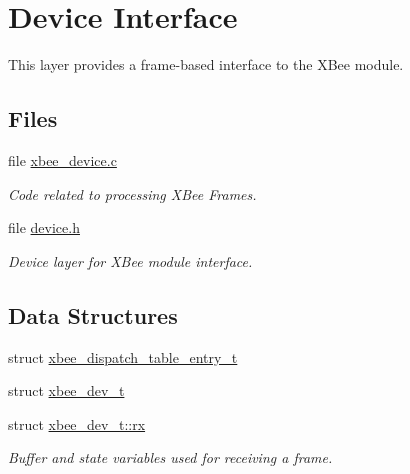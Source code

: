 \hypertarget{group__xbee__device}{\section{Device Interface}
\label{group__xbee__device}
}


This layer provides a frame-\/based interface to the X\-Bee module.  


\subsection*{Files}
\begin{DoxyCompactItemize}
\item 
file \hyperlink{xbee__device_8c}{xbee\-\_\-device.\-c}
\begin{DoxyCompactList}\small\item\em Code related to processing X\-Bee Frames. \end{DoxyCompactList}\item 
file \hyperlink{device_8h}{device.\-h}
\begin{DoxyCompactList}\small\item\em Device layer for X\-Bee module interface. \end{DoxyCompactList}\end{DoxyCompactItemize}
\subsection*{Data Structures}
\begin{DoxyCompactItemize}
\item 
struct \hyperlink{structxbee__dispatch__table__entry__t}{xbee\-\_\-dispatch\-\_\-table\-\_\-entry\-\_\-t}
\item 
struct \hyperlink{structxbee__dev__t}{xbee\-\_\-dev\-\_\-t}
\item 
struct \hyperlink{structxbee__dev__t_1_1rx}{xbee\-\_\-dev\-\_\-t\-::rx}
\begin{DoxyCompactList}\small\item\em Buffer and state variables used for receiving a frame. \end{DoxyCompactList}\end{DoxyCompactItemize}
